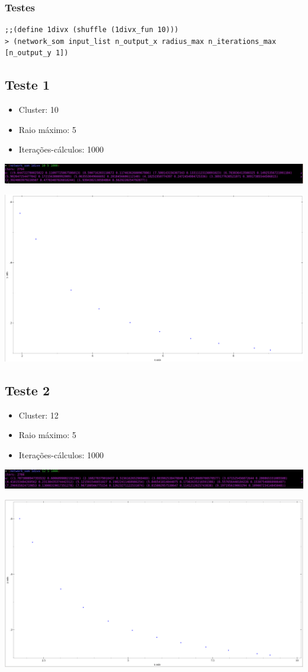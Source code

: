 \documentclass[11pt]{article}
\begin{document}
\subsubsection{Testes}
\label{sec-1-1-1}

\begin{verbatim}
;;(define 1divx (shuffle (1divx_fun 10)))
> (network_som input_list n_output_x radius_max n_iterations_max [n_output_y 1])
\end{verbatim}

\subsection{Teste 1}
\label{sec-1-2}
\begin{itemize}
\item Cluster: 10
\item Raio máximo: 5
\item Iterações-cálculos: 1000
\end{itemize}

\includegraphics[width=.9\linewidth]{images/t1-results.png}

\includegraphics[width=.9\linewidth]{images/t1-plot.png}

\subsection{Teste 2}
\label{sec-1-3}
\begin{itemize}
\item Cluster: 12
\item Raio máximo: 5
\item Iterações-cálculos: 1000
\end{itemize}

\includegraphics[width=.9\linewidth]{images/t2-results.png}

\includegraphics[width=.9\linewidth]{images/t2-plot.png}
\end{document}
